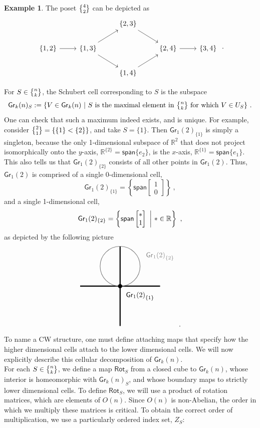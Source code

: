 \documentclass{article}
\newcommand{\bb}[1]{\mathbb{#1}}
\newcommand{\msf}[1]{\mathsf{#1}}
\newcommand{\gr}{\msf{Gr}}
\newcommand{\spn}{\msf{span}}
\newcommand{\nchoosek}{\textstyle\genfrac{\lbrace}{\rbrace}{0pt}{}}
\newcommand{\rot}{\msf{Rot}}
\theoremstyle{definition}
\newtheorem{example}[theorem]{Example}
\begin{document}
\begin{example}
    The poset $\nchoosek{4}{2}$ can be depicted as
    $$\begin{tikzcd}
            &&\{2,3\}\arrow[dr]&&\\
            \{1,2\}\arrow[r]&\{1,3\}\arrow[ur]\arrow[dr]&&\{2,4\}\arrow[r]&\{3,4\}\\
            &&\{1,4\}\arrow[ur]&&
        \end{tikzcd}~.$$
\end{example}

For $S \in \nchoosek{n}{k}$, the Schubert cell corresponding to $S$
is the subspace
$$\gr_k(n)_S := \{ V \in \gr_k(n) ~|~ 
    \text{$S$ is the maximal element in } {\nchoosek{n}{k}} \text{ for which }V \in U_S \}~.$$
One can check that such a maximum indeed exists, and is unique.
For example, consider $\nchoosek{2}{1} = \{\{1\}<\{2\}\}$, and take $S = \{1\}$. Then $\gr_1(2)_{\{1\}}$
is simply a singleton, because the only 1-dimensional subspace of $\bb{R}^2$ that does not project isomorphically
onto the $y$-axis, $\bb{R}^{\{2\}}=\spn\{e_2\}$, is the $x$-axis, $\bb{R}^{\{1\}} = \spn\{e_1\}$. This also
tells us that $\gr_1(2)_{\{2\}}$ consists of all other points in $\gr_1(2)$. Thus, $\gr_1(2)$ is comprised of a single
0-dimensional cell, 
$$\gr_1(2)_{\{1\}} = \left\{\spn\begin{bmatrix}
    1\\0
\end{bmatrix}\right\}~,$$
and a single 1-dimensional cell, 
$$\gr_1(2)_{\{2\}} = \left\{\spn \begin{bmatrix}
    \ast\\ 1
\end{bmatrix} ~\bigg|~ \ast\in \RR\right\}~,$$
as depicted by the
following picture
$$
    \begin{tikzpicture}
        \draw[ultra thick,black] (-2,0)--(2,0);
        \draw[ultra thick,black] (0,-2)--(0,2);
        \draw[thick, gray] (0,1) circle (1);
        \draw[black, fill = black] (0,0) circle (.1);
        \draw (2,1.5) node {\textcolor{gray}{${\gr_1(2)}_{\{2\}}$}};
        \draw (1,-.5) node {${\gr_1(2)}_{\{1\}}$};
    \end{tikzpicture}~.
$$
To name a CW structure, one must define attaching maps that specify how the higher dimensional cells 
attach to the lower dimensional cells. 
We will now explicitly describe this cellular decomposition of $\gr_k(n)$.\\

For each $S \in \nchoosek{n}{k}$, we define
a map $\rot_S$ from a closed cube to $\gr_k(n)$, whose interior is homeomorphic with $\gr_k(n)_S$, and whose
boundary maps to strictly lower dimensional cells. 
To define $\rot_S$, we will use a product of rotation matrices, which are elements of $O(n)$. Since $O(n)$ is
non-Abelian, the order in which we multiply these matrices is critical. To obtain the correct order of multiplication,
we use a particularly ordered index set, $Z_S$:
\end{document}
